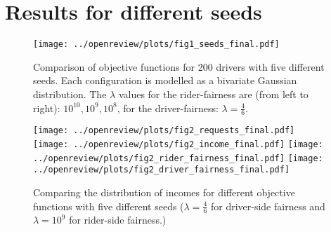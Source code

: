 \section{Results for different seeds}



\begin{figure}[!htbp]
    \centering
    \texttt{[image: ../openreview/plots/fig1\_seeds\_final.pdf]}
    \caption{Comparison of objective functions for 200 drivers with five different seeds. Each configuration is modelled as a bivariate Gaussian distribution. The $\lambda$ values for the rider-fairness are (from left to right): $10^{10}, 10^9, 10^8$, for the driver-fairness: $\lambda=\frac{4}{6}$.}
    \label{fig:drivernrcomp_seeds}
\end{figure}

\begin{figure}[!htbp]
    \centering
    \texttt{[image: ../openreview/plots/fig2\_requests\_final.pdf]}
    \texttt{[image: ../openreview/plots/fig2\_income\_final.pdf]}
    \texttt{[image: ../openreview/plots/fig2\_rider\_fairness\_final.pdf]}
    \texttt{[image: ../openreview/plots/fig2\_driver\_fairness\_final.pdf]}
    \caption{Comparing the distribution of incomes for different objective functions with five different seeds ($\lambda=\frac{4}{6}$ for driver-side fairness and $\lambda=10^9$ for rider-side fairness.)}
    \label{fig:incomedistrcomp_seeds}
\end{figure}



